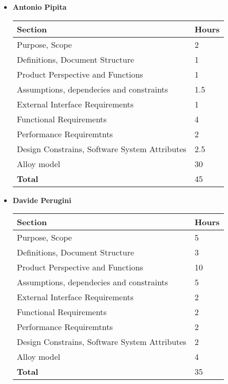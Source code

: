 \begin{itemize}
\item \textbf{Antonio Pipita}

\begin{table}[!h]
\centering
\begin{tabular}{|l|l|}
\hline
\textbf{Section}														&		\textbf{Hours}  \\ \hline
Purpose, Scope														&  	2	\\ \hline
Definitions, Document Structure							& 		1 	\\ \hline
Product Perspective and Functions						& 		1 	\\ \hline
Assumptions, dependecies and constraints			&  	1.5	\\ \hline
External Interface Requirements							& 		1 	\\ \hline
Functional Requirements										&  	4	\\ \hline
Performance Requiremtnts									&  	2	\\ \hline
Design Constrains, Software System Attributes	& 		2.5 \\ \hline
Alloy model   															&  	30  \\ \hline
\textbf{Total}															&  	45\\ \hline
\end{tabular}
\end{table}

\item \textbf{Davide Perugini}

\begin{table}[!h]
	\centering
\begin{tabular}{|l|l|}
\hline
\textbf{Section}														&		\textbf{Hours}  \\ \hline
Purpose, Scope														&  	5\\ \hline
Definitions, Document Structure							&  	3\\ \hline
Product Perspective and Functions						&  	10\\ \hline
Assumptions, dependecies and constraints			&  	5\\ \hline 
External Interface Requirements							&  	2\\ \hline
Functional Requirements										&  	2	\\ \hline
Performance Requiremtnts									& 		2	\\ \hline
Design Constrains, Software System Attributes	&  	2	\\ \hline
Alloy model   															&     4 \\ \hline
\textbf{Total}															&  	35	\\ \hline
\end{tabular}
\end{table}


\end{itemize}
